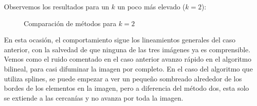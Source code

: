 Observemos los resultados para un $k$ un poco más elevado ($k=2$):

\begin{figure}[H]
    \centering
    \qquad
    \qquad
    \caption{Comparación de métodos para $k = 2$}
    \label{fig:example}
\end{figure}

En esta ocasión, el comportamiento sigue los lineamientos generales del caso anterior, con la salvedad de que ninguna de las tres imágenes ya es comprensible. Vemos como el ruido comentado en el caso anterior avanzo rápido en el algoritmo bilineal, para casi difuminar la imagen por completo. En el caso del algoritmo que utiliza splines, se puede empezar a ver un pequeño sombreado alrededor de los bordes de los elementos en la imagen, pero a diferencia del método dos, esta solo se extiende a las cercanías y no avanza por toda la imagen.

